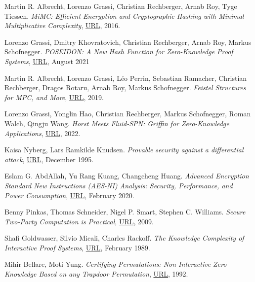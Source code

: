 \documentclass{Resources/UoBLab1}
\theoremstyle{definition}
\begin{document}
\setlength{\labelsep}{10pt} %
\begin{thebibliography}{10}
 Martin R. Albrecht, Lorenzo Grassi, Christian Rechberger, Arnab Roy, Tyge Tiessen. \textit{MiMC: Efficient Encryption and Cryptographic Hashing with Minimal Multiplicative Complexity}, \href{https://eprint.iacr.org/2016/492.pdf}{URL}, 2016.

 Lorenzo Grassi, Dmitry Khovratovich, Christian Rechberger, Arnab Roy, Markus Schofnegger. \textit{POSEIDON: A New Hash Function for Zero-Knowledge Proof Systems}, \href{https://www.usenix.org/system/files/sec21-grassi.pdf}{URL}, August 2021

 Martin R. Albrecht, Lorenzo Grassi, Léo Perrin, Sebastian Ramacher, Christian Rechberger, Dragos Rotaru, Arnab Roy, Markus Schofnegger. \textit{Feistel Structures for MPC, and More}, \href{https://eprint.iacr.org/2019/397.pdf}{URL}, 2019.

 Lorenzo Grassi, Yonglin Hao, Christian Rechberger, Markus Schofnegger, Roman Walch, Qingju Wang. \textit{Horst Meets Fluid-SPN: Griffin for Zero-Knowledge Applications}, \href{https://eprint.iacr.org/2022/403.pdf}{URL}, 2022.

 Kaisa Nyberg, Lars Ramkilde Knudsen. \textit{Provable security against a differential attack}, \href{https://link.springer.com/article/10.1007/BF00204800}{URL}, December 1995.

 Eslam G. AbdAllah, Yu Rang Kuang, Changcheng Huang. \textit{Advanced Encryption Standard New Instructions (AES-NI) Analysis: Security, Performance, and Power Consumption}, \href{https://www.sce.carleton.ca/faculty/huang/iccae-2020.pdf}{URL}, February 2020.

 Benny Pinkas, Thomas Schneider, Nigel P. Smart, Stephen C. Williams. \textit{Secure Two-Party Computation is Practical}, \href{https://eprint.iacr.org/2009/314.pdf}{URL}, 2009.

 Shafi Goldwasser, Silvio Micali, Charles Rackoff. \textit{The Knowledge Complexity of Interactive Proof Systems}, \href{https://people.csail.mit.edu/silvio/Selected%20Scientific%20Papers/Proof%20Systems/The_Knowledge_Complexity_Of_Interactive_Proof_Systems.pdf}{URL}, February 1989.

 Mihir Bellare, Moti Yung. \textit{Certifying Permutations: Non-Interactive Zero-Knowledge Based on any Trapdoor Permutation}, \href{https://cseweb.ucsd.edu/~mihir/papers/cct.pdf}{URL}, 1992.


\end{thebibliography}
\end{document}
